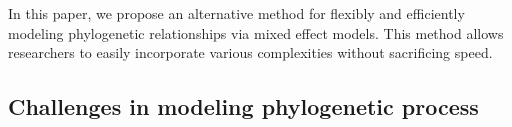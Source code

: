 \documentclass[12pt]{article}
\begin{document}
In this paper, we propose an alternative method for flexibly and efficiently modeling phylogenetic relationships via mixed effect models. 
This method allows researchers to easily incorporate various complexities without sacrificing speed.

\subsection*{Challenges in modeling phylogenetic process}
\end{document}
